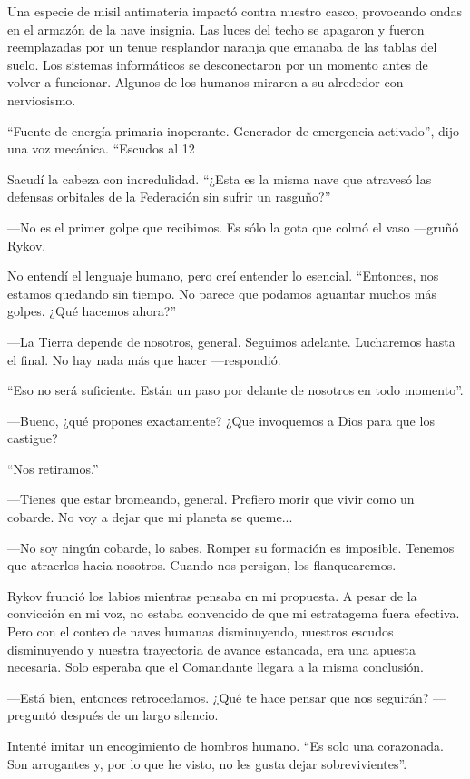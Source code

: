 Una especie de misil antimateria impactó contra nuestro casco, provocando ondas en el armazón de la nave insignia. Las luces del techo se apagaron y fueron reemplazadas por un tenue resplandor naranja que emanaba de las tablas del suelo. Los sistemas informáticos se desconectaron por un momento antes de volver a funcionar. Algunos de los humanos miraron a su alrededor con nerviosismo.

``Fuente de energía primaria inoperante. Generador de emergencia activado'', dijo una voz mecánica. ``Escudos al 12%

Sacudí la cabeza con incredulidad. ``¿Esta es la misma nave que atravesó las defensas orbitales de la Federación sin sufrir un rasguño?''

—No es el primer golpe que recibimos. Es sólo la gota que colmó el vaso —gruñó Rykov.

No entendí el lenguaje humano, pero creí entender lo esencial. ``Entonces, nos estamos quedando sin tiempo. No parece que podamos aguantar muchos más golpes. ¿Qué hacemos ahora?''

—La Tierra depende de nosotros, general. Seguimos adelante. Lucharemos hasta el final. No hay nada más que hacer —respondió.

``Eso no será suficiente. Están un paso por delante de nosotros en todo momento''.

—Bueno, ¿qué propones exactamente? ¿Que invoquemos a Dios para que los castigue?

``Nos retiramos.''


—Tienes que estar bromeando, general. Prefiero morir que vivir como un cobarde. No voy a dejar que mi planeta se queme...

—No soy ningún cobarde, lo sabes. Romper su formación es imposible. Tenemos que atraerlos hacia nosotros. Cuando nos persigan, los flanquearemos.

Rykov frunció los labios mientras pensaba en mi propuesta. A pesar de la convicción en mi voz, no estaba convencido de que mi estratagema fuera efectiva. Pero con el conteo de naves humanas disminuyendo, nuestros escudos disminuyendo y nuestra trayectoria de avance estancada, era una apuesta necesaria. Solo esperaba que el Comandante llegara a la misma conclusión.

—Está bien, entonces retrocedamos. ¿Qué te hace pensar que nos seguirán? —preguntó después de un largo silencio.

Intenté imitar un encogimiento de hombros humano. ``Es solo una corazonada. Son arrogantes y, por lo que he visto, no les gusta dejar sobrevivientes''.

